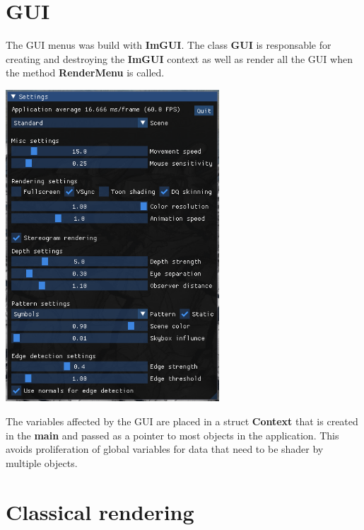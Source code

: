\documentclass[12pt, a4paper]{article}
\begin{document}
\section{GUI}
The GUI menus was build with \textbf{ImGUI}. The class \textbf{GUI} is responsable for creating and destroying the
\textbf{ImGUI} context as well as render all the GUI when the method \textbf{RenderMenu} is called.
\begin{center}
    \centering
    \includegraphics[width=0.6\textwidth]{img/gui.png}
\end{center}
The variables affected by the GUI are placed in a struct \textbf{Context} that is created in the \textbf{main} and
passed as a pointer to most objects in the application. This avoids proliferation of global variables for data 
that need to be shader by multiple objects.

\section{Classical rendering}
\end{document}
